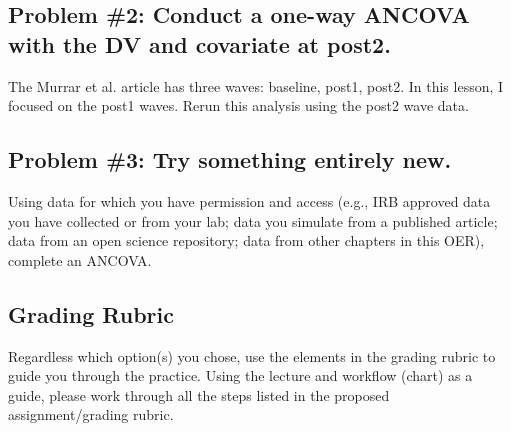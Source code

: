 \documentclass[
  11pt,
]{book}
\begin{document}
\hypertarget{problem-2-conduct-a-one-way-ancova-with-the-dv-and-covariate-at-post2.}{%
\subsection{Problem \#2: Conduct a one-way ANCOVA with the DV and covariate at post2.}\label{problem-2-conduct-a-one-way-ancova-with-the-dv-and-covariate-at-post2.}}

The Murrar et al. \citeyearpar{murrar_entertainment-education_2018}article has three waves: baseline, post1, post2. In this lesson, I focused on the post1 waves. Rerun this analysis using the post2 wave data.

\hypertarget{problem-3-try-something-entirely-new.-3}{%
\subsection{Problem \#3: Try something entirely new.}\label{problem-3-try-something-entirely-new.-3}}

Using data for which you have permission and access (e.g., IRB approved data you have collected or from your lab; data you simulate from a published article; data from an open science repository; data from other chapters in this OER), complete an ANCOVA.

\hypertarget{grading-rubric-7}{%
\subsection{Grading Rubric}\label{grading-rubric-7}}

Regardless which option(s) you chose, use the elements in the grading rubric to guide you through the practice. Using the lecture and workflow (chart) as a guide, please work through all the steps listed in the proposed assignment/grading rubric.
\end{document}
